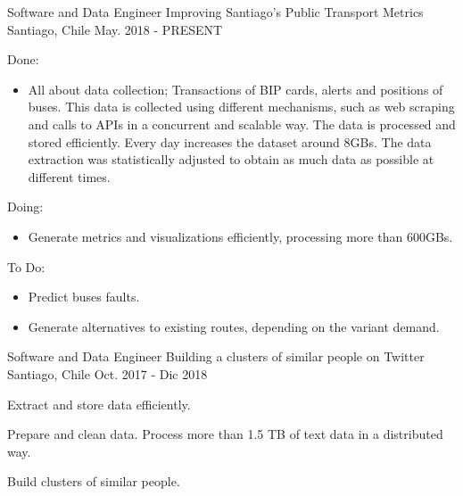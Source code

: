 

\begin{cventries}

  \cventry
    {Software and Data Engineer} %
    {Improving Santiago's Public Transport Metrics} %
    {Santiago, Chile} %
    {May. 2018 - PRESENT} %
    {
      \begin{cvitems} %
        \item {Done:}
      	\begin{itemize}
      		\item {All about data collection; Transactions of BIP cards, alerts and positions of buses. This data is collected using different mechanisms, such as web scraping and calls to APIs in a concurrent and scalable way. The data is processed and stored efficiently. Every day increases the dataset around 8GBs. The data extraction was statistically adjusted to obtain as much data as possible at different times.}
      	\end{itemize}
      	\item {Doing:}
      	\begin{itemize}
        	\item {Generate metrics and visualizations efficiently, processing more than 600GBs.}
      	\end{itemize}
      	\item {To Do:}
      	\begin{itemize}
        	\item {Predict buses faults.}
	        \item {Generate alternatives to existing routes, depending on the variant demand.}
      	\end{itemize}
      \end{cvitems}
    }

  \cventry
    {Software and Data Engineer} %
    {Building a clusters of similar people on Twitter} %
    {Santiago, Chile} %
    {Oct. 2017 - Dic 2018} %
    {
      \begin{cvitems} %
		\item {Extract and store data efficiently.}        
        \item {Prepare and clean data. Process more than 1.5 TB of text data in a distributed way.}
        \item {Build clusters of similar people.}
      \end{cvitems}
    }

\end{cventries}
